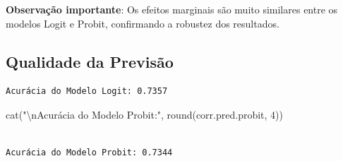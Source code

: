 \documentclass[
  letterpaper,
  DIV=11,
  numbers=noendperiod]{scrartcl}
\newenvironment{Shaded}{\begin{snugshade}}{\end{snugshade}}
\newcommand{\CommentTok}[1]{\textcolor[rgb]{0.37,0.37,0.37}{#1}}
\newcommand{\DecValTok}[1]{\textcolor[rgb]{0.68,0.00,0.00}{#1}}
\newcommand{\FloatTok}[1]{\textcolor[rgb]{0.68,0.00,0.00}{#1}}
\newcommand{\FunctionTok}[1]{\textcolor[rgb]{0.28,0.35,0.67}{#1}}
\newcommand{\NormalTok}[1]{\textcolor[rgb]{0.00,0.23,0.31}{#1}}
\newcommand{\OtherTok}[1]{\textcolor[rgb]{0.00,0.23,0.31}{#1}}
\newcommand{\SpecialCharTok}[1]{\textcolor[rgb]{0.37,0.37,0.37}{#1}}
\newcommand{\StringTok}[1]{\textcolor[rgb]{0.13,0.47,0.30}{#1}}
\begin{document}
\textbf{Observação importante}: Os efeitos marginais são muito similares
entre os modelos Logit e Probit, confirmando a robustez dos resultados.

\subsection{Qualidade da Previsão}\label{qualidade-da-previsuxe3o}

\begin{Shaded}
\end{Shaded}

\begin{verbatim}
Acurácia do Modelo Logit: 0.7357
\end{verbatim}

\begin{Shaded}
\begin{Highlighting}[]
\FunctionTok{cat}\NormalTok{(}\StringTok{"}\SpecialCharTok{\textbackslash{}n}\StringTok{Acurácia do Modelo Probit:"}\NormalTok{, }\FunctionTok{round}\NormalTok{(corr.pred.probit, }\DecValTok{4}\NormalTok{))}
\end{Highlighting}
\end{Shaded}

\begin{verbatim}

Acurácia do Modelo Probit: 0.7344
\end{verbatim}
\end{document}
